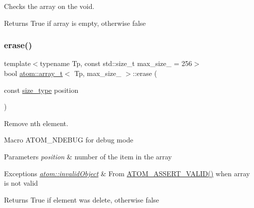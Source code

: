 Checks the array on the void. 

\begin{DoxyReturn}{Returns}
True if array is empty, otherwise false 
\end{DoxyReturn}
\mbox{\label{classatom_1_1array__t_a2d07b56eadfc3c1aed378d918366f859}} 
\subsubsection{\texorpdfstring{erase()}{erase()}}
{\footnotesize\ttfamily template$<$typename Tp, const std\+::size\+\_\+t max\+\_\+size\+\_\+ = 256$>$ \\
bool \hyperlink{classatom_1_1array__t}{atom\+::array\+\_\+t}$<$ Tp, max\+\_\+size\+\_\+ $>$\+::erase (\begin{DoxyParamCaption}\item[{const \hyperlink{classatom_1_1array__t_a8534f23c7f0082698cbd708e1f2e26ff}{size\+\_\+type}}]{position }\end{DoxyParamCaption})\hspace{0.3cm}{\ttfamily [inline]}}



Remove nth element. 

Macro A\+T\+O\+M\+\_\+\+N\+D\+E\+B\+UG for debug mode 
\begin{DoxyParams}{Parameters}
{\em position} & number of the item in the array \\
\hline
\end{DoxyParams}

\begin{DoxyExceptions}{Exceptions}
{\em \hyperlink{classatom_1_1invalid_object}{atom\+::invalid\+Object}} & From \hyperlink{debug__tools_8h_a273b49426c51bc6a7eb989ee0acbdc6b}{A\+T\+O\+M\+\_\+\+A\+S\+S\+E\+R\+T\+\_\+\+V\+A\+L\+I\+D()} when array is not valid \\
\hline
\end{DoxyExceptions}
\begin{DoxyReturn}{Returns}
True if element was delete, otherwise false 
\end{DoxyReturn}
\mbox{\label{classatom_1_1array__t_a3062d6888dd690495402b2dadbafe727}} 
